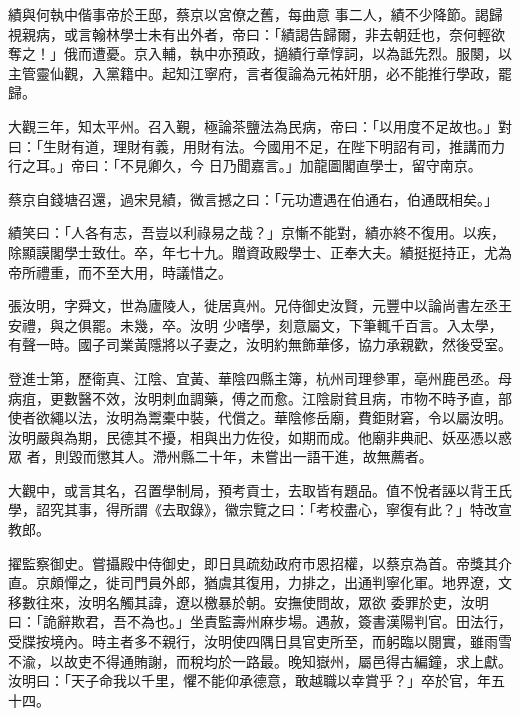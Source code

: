 \begin{pinyinscope}
 績與何執中偕事帝於王邸，蔡京以宮僚之舊，每曲意
 事二人，績不少降節。謁歸視親病，或言翰林學士未有出外者，帝曰：「績謁告歸爾，非去朝廷也，奈何輕欲奪之！」俄而遭憂。京入輔，執中亦預政，擿績行章惇詞，以為詆先烈。服闋，以主管靈仙觀，入黨籍中。起知江寧府，言者復論為元祐奸朋，必不能推行學政，罷歸。



 大觀三年，知太平州。召入覲，極論茶鹽法為民病，帝曰：「以用度不足故也。」對曰：「生財有道，理財有義，用財有法。今國用不足，在陛下明詔有司，推講而力行之耳。」帝曰：「不見卿久，今
 日乃聞嘉言。」加龍圖閣直學士，留守南京。



 蔡京自錢塘召還，過宋見績，微言撼之曰：「元功遭遇在伯通右，伯通既相矣。」



 績笑曰：「人各有志，吾豈以利祿易之哉？」京慚不能對，績亦終不復用。以疾，除顯謨閣學士致仕。卒，年七十九。贈資政殿學士、正奉大夫。績挺挺持正，尤為帝所禮重，而不至大用，時議惜之。



 張汝明，字舜文，世為廬陵人，徙居真州。兄侍御史汝賢，元豐中以論尚書左丞王安禮，與之俱罷。未幾，卒。汝明
 少嗜學，刻意屬文，下筆輒千百言。入太學，有聲一時。國子司業黃隱將以子妻之，汝明約無飾華侈，協力承親歡，然後受室。



 登進士第，歷衛真、江陰、宜黃、華陰四縣主簿，杭州司理參軍，亳州鹿邑丞。母病疽，更數醫不效，汝明刺血調藥，傅之而愈。江陰尉貧且病，市物不時予直，部使者欲繩以法，汝明為鬻橐中裝，代償之。華陰修岳廟，費鉅財窘，令以屬汝明。汝明嚴與為期，民德其不擾，相與出力佐役，如期而成。他廟非典祀、妖巫憑以惑眾
 者，則毀而懲其人。滯州縣二十年，未嘗出一語干進，故無薦者。



 大觀中，或言其名，召置學制局，預考貢士，去取皆有題品。值不悅者誣以背王氏學，詔究其事，得所謂《去取錄》，徽宗覽之曰：「考校盡心，寧復有此？」特改宣教郎。



 擢監察御史。嘗攝殿中侍御史，即日具疏劾政府市恩招權，以蔡京為首。帝獎其介直。京頗憚之，徙司門員外郎，猶虞其復用，力排之，出通判寧化軍。地界遼，文移數往來，汝明名觸其諱，遼以檄暴於朝。安撫使問故，眾欲
 委罪於吏，汝明曰：「詭辭欺君，吾不為也。」坐責監壽州麻步場。遇赦，簽書漢陽判官。田法行，受牒按境內。時主者多不親行，汝明使四隅日具官吏所至，而躬臨以閱實，雖雨雪不渝，以故吏不得通賄謝，而稅均於一路最。晚知嶽州，屬邑得古編鐘，求上獻。汝明曰：「天子命我以千里，懼不能仰承德意，敢越職以幸賞乎？」卒於官，年五十四。




\end{pinyinscope}
